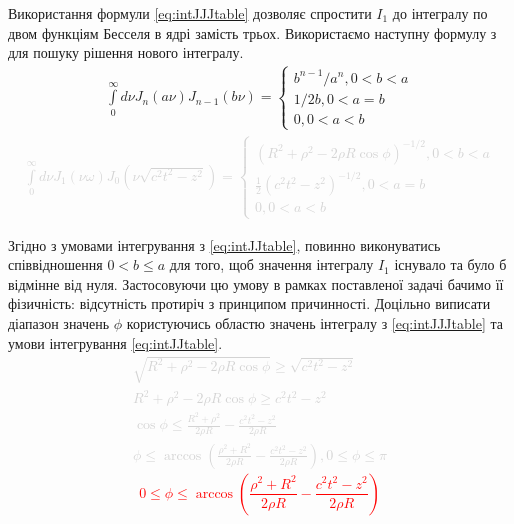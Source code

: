 Використання формули \eqref{eq:intJJJtable} дозволяє спростити $ I_1 $ до 
інтегралу по двом функціям Бесселя в ядрі замість трьох. Використаємо наступну 
формулу з \cite{Golubovic2013} для пошуку рішення нового інтегралу. 
%
\begin{equation} \begin{aligned} \label{eq:intJJtable}
\int\limits_{0}^{\infty} d \nu
J_n \left( a \nu \right) J_{n-1} \left( b \nu \right) = \begin{cases} 
b^{n-1} / a^n , 0 < b < a \\
1 / 2 b , 0 < a = b \\
0 , 0 < a < b
\end{cases} 
\end{aligned} \end{equation}
%
\textcolor{lightgray}{ \begin{equation*} \begin{aligned}
\int\limits_{0}^{\infty} d \nu J_1 \left( \nu \omega \right) 
J_0 \left( \nu \sqrt{c^2 t^2 - z^2} \right) = \begin{cases}
\left( R^2 + \rho^2 - 2 \rho R \cos \phi \right)^{-1/2}, 0 < b < a \\
\frac{1}{2} \left( c^2 t^2 - z^2 \right)^{-1/2}, 0 < a = b \\
0 , 0 < a < b
\end{cases} 
\end{aligned} \end{equation*} }

Згідно з умовами інтегрування з \eqref{eq:intJJtable}, повинно виконуватись 
співвідношення $ 0 < b \leq a $ для того, щоб значення інтегралу $ I_1 $ 
існувало та було б відмінне від нуля. Застосовуючи цю умову в рамках поставленої 
задачі бачимо її фізичність: відсутність протиріч з принципом причинності. 
Доцільно виписати діапазон значень $ \phi $ користуючись областю значень 
інтегралу з \eqref{eq:intJJJtable} та умови інтегрування \eqref{eq:intJJtable}.
%
\textcolor{lightgray}{ \begin{equation*} \begin{aligned}
\sqrt{R^2 + \rho^2 - 2 \rho R \cos \phi} \geq \sqrt{c^2 t^2 - z^2} \\
R^2 + \rho^2 - 2 \rho R \cos \phi \geq c^2 t^2 - z^2 \\
\cos \phi \leq \frac{R^2 + \rho^2}{2 \rho R} - \frac{c^2 t^2 - z^2}{2 \rho R} \\
\phi \leq \arccos \left( \frac{\rho^2 + R^2}{2 \rho R} - 
\frac{c^2 t^2 - z^2}{2 \rho R} \right), 0 \leq \phi \leq \pi
\end{aligned} \end{equation*} }
%
\textcolor{red}{ \begin{equation*}
0 \leq \phi \leq \arccos \left( \frac{\rho^2 + R^2}{2 \rho R} - 
\frac{c^2 t^2 - z^2}{2 \rho R} \right)
\end{equation*} }


